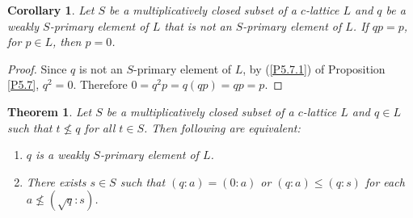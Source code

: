 \documentclass[10pt,twoside,a4paper]{amsart}
\numberwithin{equation}{section}
\theoremstyle{plain}
\newtheorem{thm}[lem]{Theorem}
\newtheorem{cor}[lem]{Corollary}
\theoremstyle{definition}
\begin{document}
\begin{cor}
	Let $S$ be a multiplicatively closed subset of a $c$-lattice $L$ and $q$ be a weakly $S$-primary element of $L$ that is not an $S$-primary element of $L$. If $qp=p$, for $p\in L$, then $p=0$.
\end{cor}
\begin{proof}
	Since $q$ is not an $S$-primary element of $L$, by (\ref{P5.7.1}) of Proposition \ref{P5.7}, $q^2=0$. Therefore $0=q^2p=q(qp)=qp=p$.
\end{proof}

\begin{thm}%
	Let $S$ be a multiplicatively closed subset of a $c$-lattice $L$ and $q \in L$ such that $t\nleq q$ for all $t\in S$. Then following are equivalent:
	\begin{enumerate}
		\item\label{T5.9.1} $q$ is a weakly $S$-primary element of $L$.
		\item\label{T5.9.2} There exists $s\in S$ such that $(q:a)=(0:a)$ or $(q:a)\leq (q:s)$ for each $a \nleq (\sqrt{q}:s)$.
	\end{enumerate}
\end{thm}	
\end{document}
